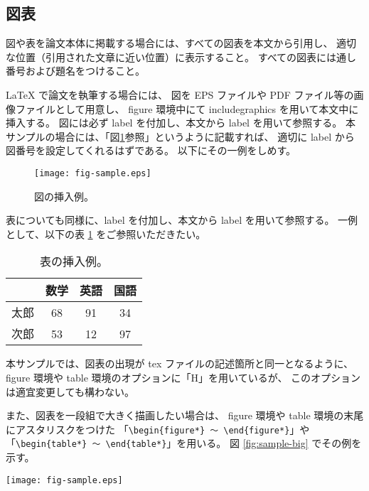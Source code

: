 \subsection{図表}

図や表を論文本体に掲載する場合には、すべての図表を本文から引用し、
適切な位置（引用された文章に近い位置）に表示すること。
すべての図表には通し番号および題名をつけること。

LaTeX で論文を執筆する場合には、
図を EPS ファイルや PDF ファイル等の画像ファイルとして用意し、
figure 環境中にて includegraphics を用いて本文中に挿入する。
図には必ず label を付加し、本文から label を用いて参照する。
本サンプルの場合には、「図\ref{fig:sample}参照」というように記載すれば、
適切に label から図番号を設定してくれるはずである。
以下にその一例をしめす。

\begin{figure}[H]
 \centering
 \texttt{[image: fig-sample.eps]}
 \caption{\small{図の挿入例。}}
 \label{fig:sample}
\end{figure}

表についても同様に、label を付加し、本文から label を用いて参照する。
一例として、以下の表 \ref{tab:sample} をご参照いただきたい。

\begin{table}[H]
 \caption{\small{表の挿入例。}}
 \centering
 \begin{tabular}{|c|c|c|c|}
	\hline
		& 数学	& 英語	& 国語	\\ \hline
	太郎	& 68	& 91	& 34	\\
	次郎	& 53	& 12	& 97	\\ \hline
 \end{tabular}
 \label{tab:sample}
\end{table}

本サンプルでは、図表の出現が tex ファイルの記述箇所と同一となるように、
figure 環境や table 環境のオプションに「H」を用いているが、
このオプションは適宜変更しても構わない。

また、図表を一段組で大きく描画したい場合は、
figure 環境や table 環境の末尾にアスタリスクをつけた
「\verb+\begin{figure*} 〜 \end{figure*}+」や
「\verb+\begin{table*} 〜 \end{table*}+」を用いる。
図 \ref{fig:sample-big} でその例を示す。

\begin{figure*}[ht]
 \centering
 \texttt{[image: fig-sample.eps]}
 \caption{\small{一段組での図の挿入例。}}
 \label{fig:sample-big}
\end{figure*}

